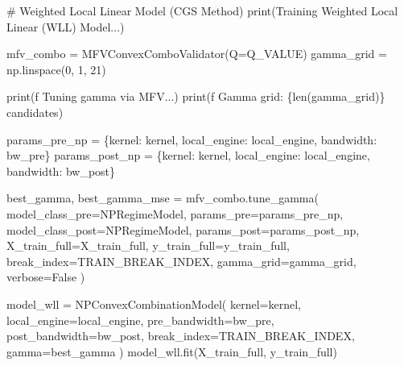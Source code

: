 \documentclass[
  letterpaper,
  DIV=11,
  numbers=noendperiod]{scrartcl}
\newenvironment{Shaded}{\begin{snugshade}}{\end{snugshade}}
\newcommand{\BuiltInTok}[1]{\textcolor[rgb]{0.00,0.23,0.31}{#1}}
\newcommand{\CommentTok}[1]{\textcolor[rgb]{0.37,0.37,0.37}{#1}}
\newcommand{\DecValTok}[1]{\textcolor[rgb]{0.68,0.00,0.00}{#1}}
\newcommand{\NormalTok}[1]{\textcolor[rgb]{0.00,0.23,0.31}{#1}}
\newcommand{\OperatorTok}[1]{\textcolor[rgb]{0.37,0.37,0.37}{#1}}
\newcommand{\SpecialCharTok}[1]{\textcolor[rgb]{0.37,0.37,0.37}{#1}}
\newcommand{\SpecialStringTok}[1]{\textcolor[rgb]{0.13,0.47,0.30}{#1}}
\newcommand{\StringTok}[1]{\textcolor[rgb]{0.13,0.47,0.30}{#1}}
\newcommand{\VariableTok}[1]{\textcolor[rgb]{0.07,0.07,0.07}{#1}}
\begin{document}
\begin{Shaded}
\begin{Highlighting}[]
\CommentTok{\# Weighted Local Linear Model (CGS Method)}
\BuiltInTok{print}\NormalTok{(}\StringTok{\textquotesingle{}Training Weighted Local Linear (WLL) Model...\textquotesingle{}}\NormalTok{)}

\NormalTok{mfv\_combo }\OperatorTok{=}\NormalTok{ MFVConvexComboValidator(Q}\OperatorTok{=}\NormalTok{Q\_VALUE)}
\NormalTok{gamma\_grid }\OperatorTok{=}\NormalTok{ np.linspace(}\DecValTok{0}\NormalTok{, }\DecValTok{1}\NormalTok{, }\DecValTok{21}\NormalTok{)}

\BuiltInTok{print}\NormalTok{(}\SpecialStringTok{f\textquotesingle{}  Tuning gamma via MFV...\textquotesingle{}}\NormalTok{)}
\BuiltInTok{print}\NormalTok{(}\SpecialStringTok{f\textquotesingle{}  Gamma grid: }\SpecialCharTok{\{}\BuiltInTok{len}\NormalTok{(gamma\_grid)}\SpecialCharTok{\}}\SpecialStringTok{ candidates\textquotesingle{}}\NormalTok{)}

\NormalTok{params\_pre\_np }\OperatorTok{=}\NormalTok{ \{}\StringTok{\textquotesingle{}kernel\textquotesingle{}}\NormalTok{: kernel, }\StringTok{\textquotesingle{}local\_engine\textquotesingle{}}\NormalTok{: local\_engine, }\StringTok{\textquotesingle{}bandwidth\textquotesingle{}}\NormalTok{: bw\_pre\}}
\NormalTok{params\_post\_np }\OperatorTok{=}\NormalTok{ \{}\StringTok{\textquotesingle{}kernel\textquotesingle{}}\NormalTok{: kernel, }\StringTok{\textquotesingle{}local\_engine\textquotesingle{}}\NormalTok{: local\_engine, }\StringTok{\textquotesingle{}bandwidth\textquotesingle{}}\NormalTok{: bw\_post\}}

\NormalTok{best\_gamma, best\_gamma\_mse }\OperatorTok{=}\NormalTok{ mfv\_combo.tune\_gamma(}
\NormalTok{    model\_class\_pre}\OperatorTok{=}\NormalTok{NPRegimeModel, params\_pre}\OperatorTok{=}\NormalTok{params\_pre\_np,}
\NormalTok{    model\_class\_post}\OperatorTok{=}\NormalTok{NPRegimeModel, params\_post}\OperatorTok{=}\NormalTok{params\_post\_np,}
\NormalTok{    X\_train\_full}\OperatorTok{=}\NormalTok{X\_train\_full, y\_train\_full}\OperatorTok{=}\NormalTok{y\_train\_full,}
\NormalTok{    break\_index}\OperatorTok{=}\NormalTok{TRAIN\_BREAK\_INDEX, gamma\_grid}\OperatorTok{=}\NormalTok{gamma\_grid, verbose}\OperatorTok{=}\VariableTok{False}
\NormalTok{)}

\NormalTok{model\_wll }\OperatorTok{=}\NormalTok{ NPConvexCombinationModel(}
\NormalTok{    kernel}\OperatorTok{=}\NormalTok{kernel, local\_engine}\OperatorTok{=}\NormalTok{local\_engine,}
\NormalTok{    pre\_bandwidth}\OperatorTok{=}\NormalTok{bw\_pre, post\_bandwidth}\OperatorTok{=}\NormalTok{bw\_post,}
\NormalTok{    break\_index}\OperatorTok{=}\NormalTok{TRAIN\_BREAK\_INDEX, gamma}\OperatorTok{=}\NormalTok{best\_gamma}
\NormalTok{)}
\NormalTok{model\_wll.fit(X\_train\_full, y\_train\_full)}


\end{Highlighting}
\end{Shaded}
\end{document}
